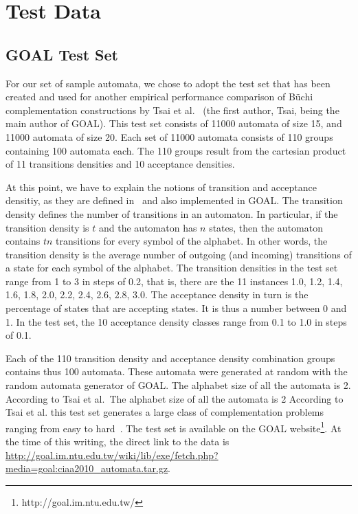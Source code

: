 \section{Test Data}
\subsection{GOAL Test Set}
\label{4_goal_testset}
For our set of sample automata, we chose to adopt the test set that has been created and used for another empirical performance comparison of Büchi complementation constructions by Tsai et al.~\cite{2010_tsai} (the first author, Tsai, being the main author of GOAL). This test set consists of 11000 automata of size 15, and 11000 automata of size 20. Each set of 11000 automata consists of 110 groups containing 100 automata each. The 110 groups result from the cartesian product of 11 transitions densities and 10 acceptance densities.

At this point, we have to explain the notions of transition and acceptance densitiy, as they are defined in~\cite{2010_tsai} and also implemented in GOAL. The transition density defines the number of transitions in an automaton. In particular, if the transition density is $t$ and the automaton has $n$ states, then the automaton contains $tn$ transitions for every symbol of the alphabet. In other words, the transition density is the average number of outgoing (and incoming) transitions of a state for each symbol of the alphabet. The transition densities in the test set range from 1 to 3 in steps of 0.2, that is, there are the 11 instances 1.0, 1.2, 1.4, 1.6, 1.8, 2.0, 2.2, 2.4, 2.6, 2.8, 3.0. The acceptance density in turn is the percentage of states that are accepting states. It is thus a number between 0 and 1. In the test set, the 10 acceptance density classes range from 0.1 to 1.0 in steps of 0.1.

Each of the 110 transition density and acceptance density combination groups contains thus 100 automata. These automata were generated at random with the random automata generator of GOAL. The alphabet size of all the automata is 2. According to Tsai et al.~The alphabet size of all the automata is 2 According to Tsai et al. this test set generates a large class of complementation problems ranging from easy to hard~\cite{2010_tsai}. The test set is available on the GOAL website\footnote{http://goal.im.ntu.edu.tw/}. At the time of this writing, the direct link to the data is \url{http://goal.im.ntu.edu.tw/wiki/lib/exe/fetch.php?media=goal:ciaa2010_automata.tar.gz}.

